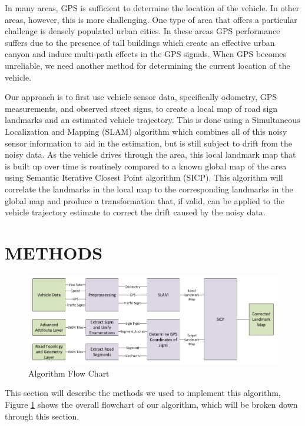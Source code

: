 \documentclass[letterpaper, 10 pt, conference]{ieeeconf}  %
\begin{document}
In many areas, GPS is sufficient to determine the location of the vehicle. In other areas, however, this is more challenging. One type of area that offers a particular challenge is densely populated urban cities. In these areas GPS performance suffers due to the presence of tall buildings which create an effective urban canyon and induce multi-path effects in the GPS signals. When GPS becomes unreliable, we need another method for determining the current location of the vehicle.

Our approach is to first use vehicle sensor data, specifically odometry, GPS measurements, and observed street signs, to create a local map of road sign landmarks and an estimated vehicle trajectory. This is done using a Simultaneous Localization and Mapping (SLAM) algorithm which combines all of this noisy sensor information to aid in the estimation, but is still subject to drift from the noisy data. As the vehicle drives through the area, this local landmark map that is built up over time is routinely compared to a known global map of the area using Semantic Iterative Closest Point algorithm (SICP). This algorithm will correlate the landmarks in the local map to the corresponding landmarks in the global map and produce a transformation that, if valid, can be applied to the vehicle trajectory estimate to correct the drift caused by the noisy data.

\section{METHODS}

\begin{figure}[thpb]
  \centering
  \includegraphics[width=\linewidth]{Methods_Flow_Chart.png}
  \caption{Algorithm Flow Chart}
  \label{fig:flowchart}
\end{figure}

This section will describe the methods we used to implement this algorithm, Figure \ref{fig:flowchart} shows the overall flowchart of our algorithm, which will be broken down through this section.
\end{document}
